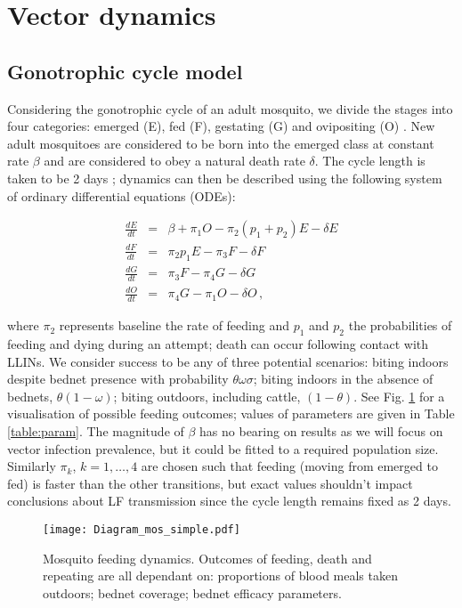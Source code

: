 \documentclass[5p,times]{elsarticle}
\begin{document}
\section{Vector dynamics}

\subsection{Gonotrophic cycle model}

Considering the gonotrophic cycle of an adult mosquito, we divide the stages into four categories: emerged (E), fed (F), gestating (G) and ovipositing (O) \cite{killeen2016}. New adult mosquitoes are considered to be born into the emerged class at constant rate $\beta$ and are considered to obey a natural death rate $\delta$. The cycle length is taken to be 2 days \cite{killeen2016}; dynamics can then be described using the following system of ordinary differential equations (ODEs):

\begin{eqnarray}
\frac{dE}{dt} &=& \beta + \pi_1O - \pi_2(p_1+p_2)E -\delta E \\
\frac{dF}{dt} &=& \pi_2p_1E - \pi_3 F - \delta F \\
\frac{dG}{dt} &=& \pi_3F - \pi_4G - \delta G \\
\frac{dO}{dt} &=& \pi_4G - \pi_1O - \delta O \,,
\end{eqnarray}

where $\pi_2$ represents baseline the rate of feeding and $p_1$ and $p_2$ the probabilities of feeding and dying during an attempt; death can occur following contact with LLINs. We consider success to be any of three potential scenarios: biting indoors despite bednet presence with probability $\theta\omega\sigma$; biting indoors in the absence of bednets, $\theta(1-\omega)$; biting outdoors, including cattle, $(1-\theta)$. See Fig. \ref{fig:diag_vec} for a visualisation of possible feeding outcomes; values of parameters are given in Table \ref{table:param}. The magnitude of $\beta$ has no bearing on results as we will focus on vector infection prevalence, but it could be fitted to a required population size. Similarly $\pi_k$, $k=1,\dots,4$ are chosen such that feeding (moving from emerged to fed) is faster than the other transitions, but exact values shouldn't impact conclusions about LF transmission since the cycle length remains fixed as 2 days. 

\begin{figure}[h]
\begin{center}
\texttt{[image: Diagram\_mos\_simple.pdf]}
\caption{Mosquito feeding dynamics. Outcomes of feeding, death and repeating are all dependant on: proportions of blood meals taken outdoors; bednet coverage; bednet efficacy parameters.}
\label{fig:diag_vec}
\end{center}
\end{figure}
\end{document}

